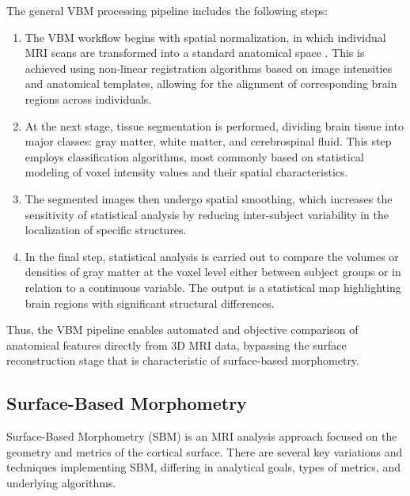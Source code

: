 \documentclass[default]{subfiles}
\begin{document}
The general VBM processing pipeline includes the following steps:\newline

\begin{enumerate}
    \item The VBM workflow begins with spatial normalization, in which individual MRI scans are transformed into a
    standard anatomical space \cite{desikan_2006}. This is achieved using non-linear registration algorithms based on
    image intensities and anatomical templates, allowing for the alignment of corresponding brain regions across
    individuals.
    
    \item At the next stage, tissue segmentation is performed, dividing brain tissue into major classes: gray matter,
    white matter, and cerebrospinal fluid. This step employs classification algorithms, most commonly based on
    statistical modeling of voxel intensity values and their spatial characteristics.
    
    \item  The segmented images then undergo spatial smoothing, which increases the sensitivity of statistical analysis
    by reducing inter-subject variability in the localization of specific structures.
    
    \item  In the final step, statistical analysis is carried out to compare the volumes or densities of gray matter at
    the voxel level either between subject groups or in relation to a continuous variable. The output is a statistical
    map highlighting brain regions with significant structural differences.\newline
\end{enumerate}


Thus, the VBM pipeline enables automated and objective comparison of anatomical features directly from 3D MRI data,
bypassing the surface reconstruction stage that is characteristic of surface-based morphometry.

\subsection{Surface-Based Morphometry}
Surface-Based Morphometry (SBM) is an MRI analysis approach focused on the geometry and metrics of the cortical
surface. There are several key variations and techniques implementing SBM, differing in analytical goals, types of
metrics, and underlying algorithms.
\end{document}

